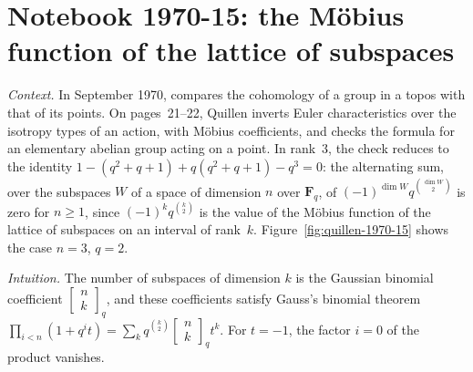 \section[Notebook 1970-15: the Möbius function of the lattice of subspaces]{Notebook 1970-15: the Möbius function of the lattice of subspaces\protect{}}\label{sec:quillen-1970-15}

\emph{Context.} In September 1970,  compares the cohomology of a group in a topos with that of its points. On pages~21--22, Quillen inverts Euler characteristics over the isotropy types of an action, with Möbius coefficients, and checks the formula for an elementary abelian group acting on a point. In rank~$3$, the check reduces to the identity $1 - (q^2 + q + 1) + q(q^2 + q + 1) - q^3 = 0$: the alternating sum, over the subspaces $W$ of a space of dimension $n$ over $\mathbf F_q$, of $(-1)^{\dim W} q^{\binom{\dim W}{2}}$ is zero for $n \ge 1$, since $(-1)^k q^{\binom{k}{2}}$ is the value of the Möbius function of the lattice of subspaces on an interval of rank~$k$. Figure~\ref{fig:quillen-1970-15} shows the case $n = 3$, $q = 2$.

\emph{Intuition.} The number of subspaces of dimension $k$ is the Gaussian binomial coefficient $\left[\begin{smallmatrix} n \\ k \end{smallmatrix}\right]_q$, and these coefficients satisfy Gauss's binomial theorem $\prod_{i < n}(1 + q^i t) = \sum_k q^{\binom{k}{2}} \left[\begin{smallmatrix} n \\ k \end{smallmatrix}\right]_q t^k$. For $t = -1$, the factor $i = 0$ of the product vanishes.


